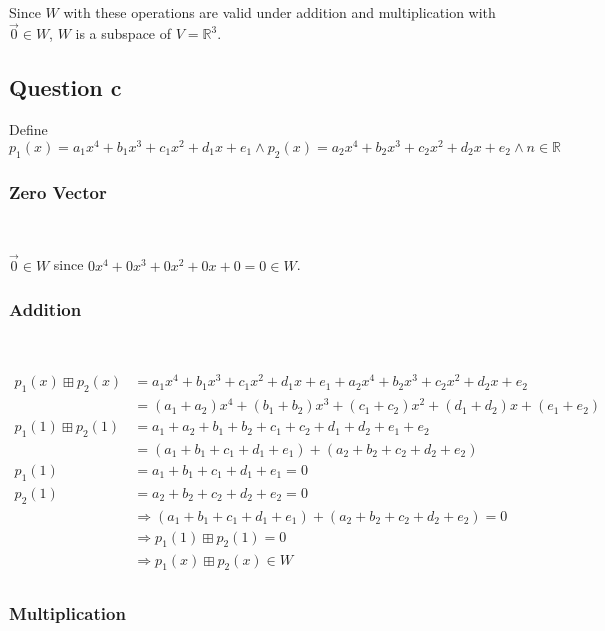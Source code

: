 \documentclass{article}
\def\R{\mathbb{R}}
\begin{document}
~

Since $W$ with these operations are valid under addition and multiplication with $\overrightarrow{0} \in W$, $W$ is a subspace of $V = \R^3$.

\subsection{Question c}

Define $p_1(x)=a_1x^4+b_1x^3+c_1x^2+d_1x+e_1 \land p_2(x)=a_2x^4+b_2x^3+c_2x^2+d_2x+e_2 \land n \in \R$

\subsubsection{Zero Vector}

~

$\overrightarrow{0} \in W$ since $0x^4+0x^3+0x^2+0x+0=0 \in W$.

\subsubsection{Addition}

~

\begin{equation}
\tag{3.3.2-1}
\begin{split}
p_1(x)\boxplus p_2(x)&=a_1x^4+b_1x^3+c_1x^2+d_1x+e_1+a_2x^4+b_2x^3+c_2x^2+d_2x+e_2\\
&= (a_1+a_2)x^4+(b_1+b_2)x^3+(c_1+c_2)x^2+(d_1+d_2)x+(e_1+e_2)\\
p_1(1)\boxplus p_2(1)&=a_1+a_2+b_1+b_2+c_1+c_2+d_1+d_2+e_1+e_2\\
&=(a_1+b_1+c_1+d_1+e_1)+(a_2+b_2+c_2+d_2+e_2)\\
p_1(1)&=a_1+b_1+c_1+d_1+e_1=0\\
p_2(1)&=a_2+b_2+c_2+d_2+e_2=0\\
&\Rightarrow (a_1+b_1+c_1+d_1+e_1)+(a_2+b_2+c_2+d_2+e_2) =0\\
&\Rightarrow p_1(1)\boxplus p_2(1)=0\\
&\Rightarrow p_1(x)\boxplus p_2(x) \in W\\
\end{split}
\end{equation}

\subsubsection{Multiplication}

~
\end{document}
